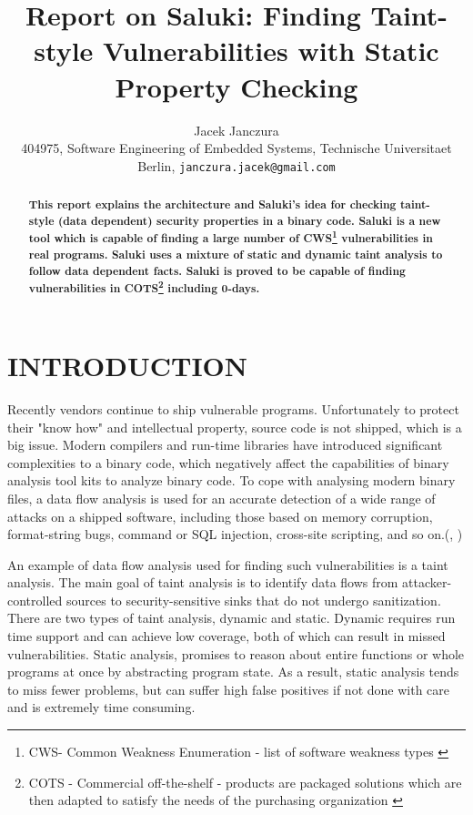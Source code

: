 \documentclass[a4paper, 12pt, journal, onecolumn]{IEEEtran}
\title{\LARGE \bf
Report on Saluki: Finding Taint-style Vulnerabilities with Static Property Checking
}
\author{Jacek Janczura \\ \small{404975, Software Engineering of Embedded Systems, Technische Universitaet Berlin, {\tt janczura.jacek@gmail.com}}}%
\begin{document}
\maketitle
\thispagestyle{fancy}
\pagestyle{fancy}


\begin{abstract}
\textbf{This report explains the architecture and Saluki's idea for checking taint-style (data dependent) security properties in a binary code. Saluki is a new tool which is capable of finding a large number of CWS\footnote{CWS- Common Weakness Enumeration - list of software weakness types \cite{a2}} vulnerabilities in real programs. Saluki uses a mixture of static and dynamic taint analysis to follow data dependent facts. Saluki is proved to be capable of finding vulnerabilities in COTS\footnote{ COTS - Commercial off-the-shelf -  products are packaged solutions which are then adapted to satisfy the needs of the purchasing organization \cite{a1}} including 0-days.}

\end{abstract}


\section{INTRODUCTION}

Recently vendors continue to ship vulnerable programs. Unfortunately to protect their "know how" and intellectual property, source code is not shipped, which is a big issue. Modern compilers and run-time libraries have introduced significant complexities to a binary code, which negatively affect the capabilities of binary analysis tool kits to analyze binary code. \cite{binaries} To cope with analysing modern binary files, a data flow analysis is used for an accurate detection of a wide range of attacks on a shipped software, including those based on memory corruption, format-string bugs, command or SQL injection, cross-site scripting, and so on.(\cite{a7}, \cite{Pietraszek2006})

An example of data flow analysis used for finding such vulnerabilities is a taint analysis. The main goal of taint analysis is to identify data flows from attacker-controlled sources to security-sensitive sinks that do not undergo sanitization.\cite{a5} \cite{a6}
There are two types of taint analysis, dynamic and static. \cite{sdtaint} Dynamic requires run time support and can achieve low coverage, both of which can result in missed vulnerabilities. Static analysis, promises to reason about entire functions or whole programs at once by abstracting program state. As a result, static analysis tends to miss fewer problems, but can suffer high false positives if not done with care and is extremely time consuming. \cite{saluki} 
\end{document}
